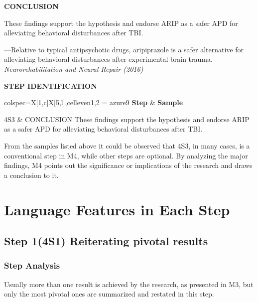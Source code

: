 \documentclass[a4paper]{ctexbook}
\begin{document}
\begin{sample}[label={myautocounter}]{\heiti}
  
  \textbf{CONCLUSION}
  
  These findings support the hypothesis and endorse ARIP as a safer APD for alleviating behavioral disturbances after TBI.


  \begin{flushright}
    ---Relative to typical antipsychotic drugs, aripiprazole is a safer alternative for alleviating behavioral disturbances after experimental brain trauma. \emph{Neurorehabilitation and Neural Repair (2016)}
  \end{flushright}

  \tcblower

  \noindent \textbf{STEP IDENTIFICATION}

  \vspace*{10pt}
  {\small\noindent
  \begin{tblr}{colspec={X[1,c]X[5,l]},cell{even}{1,2} = {azure9}}
    \toprule
    \textbf{Step} & \textbf{Sample} \\ 
    \midrule
  
    4S3 & CONCLUSION These findings support the hypothesis and endorse ARIP as a safer APD for alleviating behavioral disturbances after TBI.\\

    \bottomrule
  \end{tblr}
  }
  
\end{sample}

From the samples listed above it could be observed that 4S3, in many cases, is a conventional step in M4, while other steps are optional. By analyzing the major findings, M4 points out the significance or implications of the research and draws a conclusion to it.

\section{Language Features in Each Step}
  \subsection{Step 1(4S1) Reiterating pivotal results}
    \subsubsection{Step Analysis}

    Usually more than one result is achieved by the research, as presented in M3, but only the most pivotal ones are summarized and restated in this step.
\end{document}
